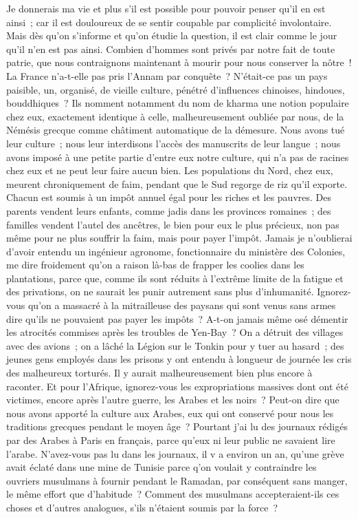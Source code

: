\documentclass[french,twoside]{book} %
\begin{document}
Je donnerais ma vie et plus s'il est possible pour pouvoir penser qu'il en est ainsi ; car il est douloureux de se sentir coupable par complicité involontaire. Mais dès qu'on s'informe et qu'on étudie la question, il est clair comme le jour qu'il n'en est pas ainsi. Combien d'hommes sont privés par notre fait de toute patrie, que nous contraignons maintenant à mourir pour nous conserver la nôtre ! La France n'a-t-elle pas pris l'Annam par conquête ? N'était-ce pas un pays paisible, un, organisé, de vieille culture, pénétré d'influences chinoises, hindoues, bouddhiques ? Ils nomment notamment du nom de kharma une notion populaire chez eux, exactement identique à celle, malheureusement oubliée par nous, de la Némésis grecque comme châtiment automatique de la démesure. Nous avons tué leur culture ; nous leur interdisons l'accès des manuscrits de leur langue ; nous avons imposé à une petite partie d'entre eux notre culture, qui n'a pas de racines chez eux et ne peut leur faire aucun bien. Les populations du Nord, chez eux, meurent chroniquement de faim, pendant que le Sud regorge de riz qu'il exporte. Chacun est soumis à un impôt annuel égal pour les riches et les pauvres. Des parents vendent leurs enfants, comme jadis dans les provinces romaines ; des familles vendent l'autel des ancêtres, le bien pour eux le plus précieux, non pas même pour ne plus souffrir la faim, mais pour payer l'impôt. Jamais je n'oublierai d'avoir entendu un ingénieur agronome, fonctionnaire du ministère des Colonies, me dire froidement qu'on a raison là-bas de frapper les coolies dans les plantations, parce que, comme ils sont réduits à l'extrême limite de la fatigue et des privations, on ne saurait les punir autrement sans plus d'inhumanité. Ignorez-vous qu'on a massacré à la mitrailleuse des paysans qui sont venus sans armes dire qu'ils ne pouvaient pas payer les impôts ? A-t-on jamais même osé démentir les atrocités commises après les troubles de Yen-Bay ? On a détruit des villages avec des avions ; on a lâché la Légion sur le Tonkin pour y tuer au hasard ; des jeunes gens employés dans les prisons y ont entendu à longueur de journée les cris des malheureux torturés. Il y aurait malheureusement bien plus encore à raconter. Et pour l'Afrique, ignorez-vous les expropriations massives dont ont été victimes, encore après l'autre guerre, les Arabes et les noirs ? Peut-on dire que nous avons apporté la culture aux Arabes, eux qui ont conservé pour nous les traditions grecques pendant le moyen âge ? Pourtant j'ai lu des journaux rédigés par des Arabes à Paris en français, parce qu'eux ni leur public ne savaient lire l'arabe. N'avez-vous pas lu dans les journaux, il v a environ un an, qu'une grève avait éclaté dans une mine de Tunisie parce q'on voulait y contraindre les ouvriers musulmans à fournir pendant le Ramadan, par conséquent sans manger, le même effort que d'habitude ? Comment des musulmans accepteraient-ils ces choses et d'autres analogues, s'ils n'étaient soumis par la force ?\par
\end{document}
